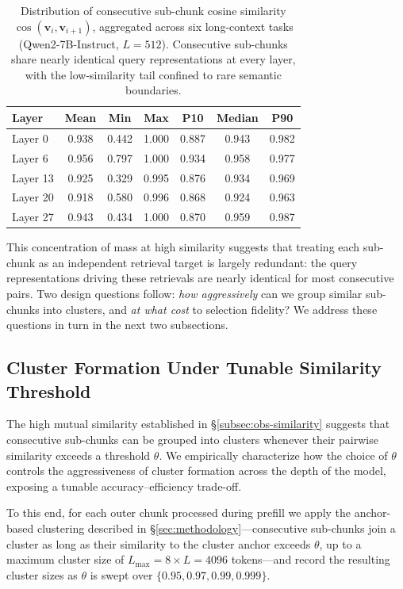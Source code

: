 \documentclass[10pt,conference]{IEEEtran}
\begin{document}
\begin{table}[t]
\centering
\caption{Distribution of consecutive sub-chunk cosine similarity 
$\cos(\mathbf{v}_i, \mathbf{v}_{i+1})$, aggregated across six 
long-context tasks (Qwen2-7B-Instruct, $L = 512$). Consecutive
sub-chunks share nearly identical query representations at every layer,
with the low-similarity tail confined to rare semantic boundaries.}
\label{tab:sim-distribution}
\small
\begin{tabular}{lcccccc}
\toprule
Layer & Mean & Min & Max & P10 & Median & P90 \\
\midrule
Layer 0  & 0.938 & 0.442 & 1.000 & 0.887 & 0.943 & 0.982 \\
Layer 6  & 0.956 & 0.797 & 1.000 & 0.934 & 0.958 & 0.977 \\
Layer 13 & 0.925 & 0.329 & 0.995 & 0.876 & 0.934 & 0.969 \\
Layer 20 & 0.918 & 0.580 & 0.996 & 0.868 & 0.924 & 0.963 \\
Layer 27 & 0.943 & 0.434 & 1.000 & 0.870 & 0.959 & 0.987 \\
\bottomrule
\end{tabular}
\end{table}

This concentration of mass at high similarity suggests that treating
each sub-chunk as an independent retrieval target is largely
redundant: the query representations driving these retrievals are
nearly identical for most consecutive pairs. Two design questions 
follow: \textit{how aggressively} can we group similar sub-chunks into 
clusters, and \textit{at what cost} to selection fidelity? We address 
these questions in turn in the next two subsections.


\subsection{Cluster Formation Under Tunable Similarity Threshold}
\label{subsec:obs-cluster}

The high mutual similarity established in §\ref{subsec:obs-similarity} 
suggests that consecutive sub-chunks can be grouped into clusters 
whenever their pairwise similarity exceeds a threshold $\theta$. We 
empirically characterize how the choice of $\theta$ controls the 
aggressiveness of cluster formation across the depth of the model, 
exposing a tunable accuracy--efficiency trade-off.

To this end, for each outer chunk processed during prefill we apply the
anchor-based clustering described in §\ref{sec:methodology}---consecutive
sub-chunks join a cluster as long as their similarity to the cluster
anchor exceeds $\theta$, up to a maximum cluster size of
$L_{\max} = 8 \times L = 4096$ tokens---and record the resulting cluster
sizes as $\theta$ is swept over $\{0.95, 0.97, 0.99, 0.999\}$.
\end{document}
